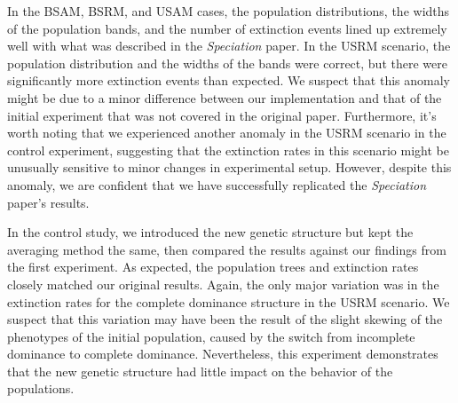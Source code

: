 \documentclass{article}
\begin{document}
In the BSAM, BSRM, and USAM cases, the population distributions, the widths of the population bands, and the number of extinction events lined up extremely well with what was described in the \textit{Speciation} paper. In the USRM scenario, the population distribution and the widths of the bands were correct, but there were significantly more extinction events than expected. We suspect that this anomaly might be due to a minor difference between our implementation and that of the initial experiment that was not covered in the original paper. Furthermore, it’s worth noting that we experienced another anomaly in the USRM scenario in the control experiment, suggesting that the extinction rates in this scenario might be unusually sensitive to minor changes in experimental setup. However, despite this anomaly, we are confident that we have successfully replicated the \textit{Speciation} paper’s results.

In the control study, we introduced the new genetic structure but kept the averaging method the same, then compared the results against our findings from the first experiment. As expected, the population trees and extinction rates closely matched our original results. Again, the only major variation was in the extinction rates for the complete dominance structure in the USRM scenario. We suspect that this variation may have been the result of the slight skewing of the phenotypes of the initial population, caused by the switch from incomplete dominance to complete dominance. Nevertheless, this experiment demonstrates that the new genetic structure had little impact on the behavior of the populations.

\newpage


\end{document}
